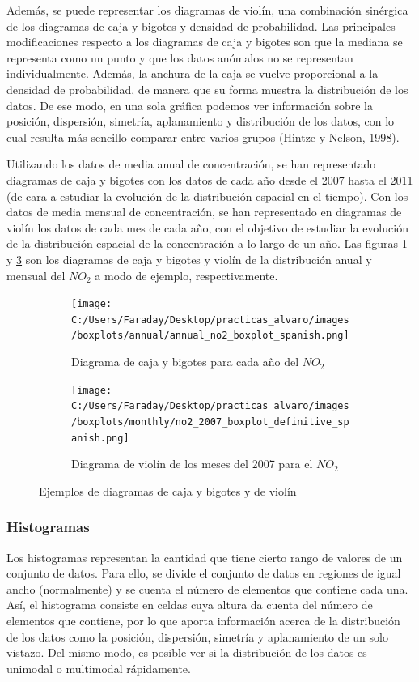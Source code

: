 \documentclass[12pt]{article}
\begin{document}
Además, se puede representar los diagramas de violín, una combinación sinérgica de los diagramas de caja y bigotes y densidad de probabilidad. Las principales modificaciones respecto a los diagramas de caja y bigotes son que la mediana se representa como un punto y que los datos anómalos no se representan individualmente. Además, la anchura de la caja se vuelve proporcional a la densidad de probabilidad, de manera que su forma muestra la distribución de los datos. De ese modo, en una sola gráfica podemos ver información sobre la posición, dispersión, simetría, aplanamiento y distribución de los datos, con lo cual resulta más sencillo comparar entre varios grupos (Hintze y Nelson, 1998).

Utilizando los datos de media anual de concentración, se han representado diagramas de caja y bigotes con los datos de cada año desde el 2007 hasta el 2011 (de cara a estudiar la evolución de la distribución espacial en el tiempo). Con los datos de media mensual de concentración, se han representado en diagramas de violín los datos de cada mes de cada año, con el objetivo de estudiar la evolución de la distribución espacial de la concentración a lo largo de un año. Las figuras \ref{fig:box-ejem-1} y \ref{fig:box-ejem-2} son los diagramas de caja y bigotes y violín de la distribución anual y mensual del $NO_{2}$ a modo de ejemplo, respectivamente.

\begin{figure}[H]
\centering
\begin{subfigure}[H]{0.45\textwidth}
\texttt{[image: C:/Users/Faraday/Desktop/practicas\_alvaro/images/boxplots/annual/annual\_no2\_boxplot\_spanish.png]}
\caption{Diagrama de caja y bigotes para cada año del $NO_{2}$}
\label{fig:box-ejem-1}
\end{subfigure}
%
\begin{subfigure}[H]{0.45\textwidth}
\texttt{[image: C:/Users/Faraday/Desktop/practicas\_alvaro/images/boxplots/monthly/no2\_2007\_boxplot\_definitive\_spanish.png]}
\caption{Diagrama de violín de los meses del 2007 para el $NO_{2}$}
\label{fig:box-ejem-2}
\end{subfigure}
\caption{Ejemplos de diagramas de caja y bigotes y de violín}
\end{figure}

\subsubsection{Histogramas}

Los histogramas representan la cantidad que tiene cierto rango de valores de un conjunto de datos. Para ello, se divide el conjunto de datos en regiones de igual ancho (normalmente) y se cuenta el número de elementos que contiene cada una. Así, el histograma consiste en celdas cuya altura da cuenta del número de elementos que contiene, por lo que aporta información acerca de la distribución de los datos como la posición, dispersión, simetría y aplanamiento de un solo vistazo. Del mismo modo, es posible ver si la distribución de los datos es unimodal o multimodal rápidamente.
\end{document}
